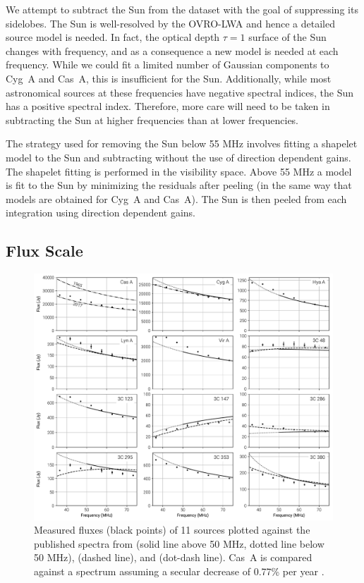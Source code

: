\documentclass[twocolumn]{aastex61}
\begin{document}
We attempt to subtract the Sun from the dataset with the goal of suppressing its sidelobes.  The Sun
is well-resolved by the OVRO-LWA and hence a detailed source model is needed. In fact, the optical
depth $\tau=1$ surface of the Sun changes with frequency, and as a consequence a new model is needed
at each frequency. While we could fit a limited number of Gaussian components to Cyg~A and Cas~A,
this is insufficient for the Sun.  Additionally, while most astronomical sources at these
frequencies have negative spectral indices, the Sun has a positive spectral index. Therefore, more
care will need to be taken in subtracting the Sun at higher frequencies than at lower frequencies.

The strategy used for removing the Sun below 55 MHz involves fitting a shapelet
\citep{2003MNRAS.338...35R} model to the Sun and subtracting without the use of direction dependent
gains. The shapelet fitting is performed in the visibility space. Above 55 MHz a model is fit to the
Sun by minimizing the residuals after peeling (in the same way that models are obtained for Cyg~A
and Cas~A). The Sun is then peeled from each integration using direction dependent gains.

\subsection{Flux Scale}

\begin{figure}[t]
    \includegraphics[width=\textwidth]{figures/flux-scale/flux-scale}
    \caption{
        Measured fluxes (black points) of 11 sources plotted against the published spectra from
        \citet{2017ApJS..230....7P} (solid line above 50 MHz, dotted line below 50 MHz),
        \citet{2012MNRAS.423L..30S} (dashed line), and \citet{1977A&A....61...99B} (dot-dash line).
        Cas~A is compared against a spectrum assuming a secular decrease of 0.77\% per year
        \citep{2009AJ....138..838H}.
    }
    \label{fig:flux-scale}
\end{figure}
\end{document}

